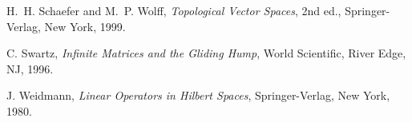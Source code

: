 \documentclass[12pt]{article}
\begin{document}
\begin{thebibliography}{199}
  H.~H. Schaefer and M.~P. Wolff,
   {\em Topological Vector Spaces}\/, 2nd ed.,
   Springer-Verlag, New York, 1999.

  C. Swartz, {\em Infinite Matrices and the Gliding Hump}\/,
   World Scientific, River Edge, NJ, 1996.
   

  J. Weidmann, {\em Linear Operators in Hilbert Spaces}\/,
   Springer-Verlag, New York, 1980.


\end{thebibliography}


\end{document}
